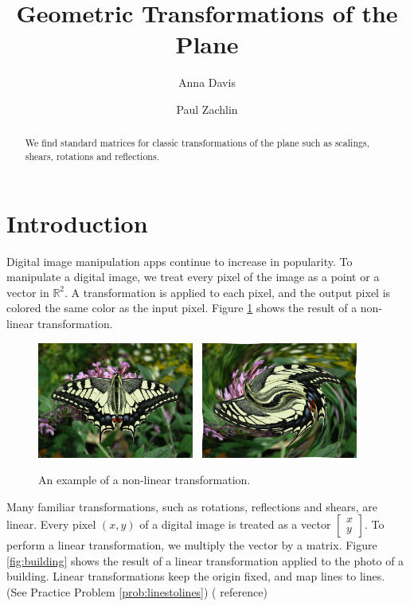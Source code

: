 \documentclass{ximera}
\author{Anna Davis \and Paul Zachlin} \title{Geometric Transformations of the Plane} \license{CC-BY 4.0}
\newcommand{\RR}{\mathbb{R}}
\begin{document}
\begin{abstract}
  We find standard matrices for classic transformations of the plane such as scalings, shears, rotations and reflections.
\end{abstract}
\maketitle

\section*{Introduction}
Digital image manipulation apps continue to increase in popularity.  To manipulate a digital image, we treat every pixel of the image as a point or a vector in $\RR^2$.  A transformation is applied to each pixel, and the output pixel is colored the same color as the input pixel.  Figure \ref{fig:swirl} shows the result of a non-linear transformation.

\begin{figure}[h]
    \centering
\includegraphics[height=1.5in]{butterfly.jpg}~
 \includegraphics[height=1.5in]{swirledbutterfly.jpg}    
 \caption{An example of a non-linear transformation.}\label{fig:swirl}
\end{figure}

Many familiar transformations, such as rotations, reflections and shears, are linear. Every pixel $(x, y)$ of a digital image is treated as a vector $\begin{bmatrix}
x\\
y
\end{bmatrix}$.  To perform a linear transformation, we multiply the vector by a matrix.  Figure \ref{fig:building} shows the result of a linear transformation applied to the photo of a building.  Linear transformations keep the origin fixed, and map lines to lines. (See Practice Problem \ref{prob:linestolines})  ({\color{red} reference})
\end{document}
